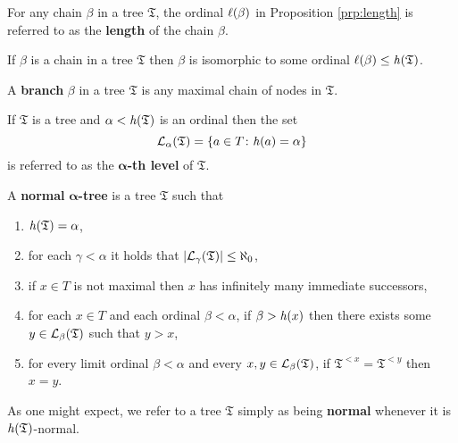 \begin{dfn}[Length]
	For any chain $\beta$ in a tree $\mathfrak{T}$, the ordinal $\ell(\beta)$ in Proposition \ref{prp:length} is referred to as the \textbf{length} of the chain $\beta$.
\end{dfn}

\begin{prp}\label{prp:length}
	If $\beta$ is a chain in a tree $\mathfrak{T}$ then $\beta$ is isomorphic to some ordinal $\ell(\beta)\leq\mathit{h}(\mathfrak{T})$.
\end{prp}

\begin{dfn}[Branch]
	A \textbf{branch} $\beta$ in a tree $\mathfrak{T}$ is any maximal chain of nodes in $\mathfrak{T}$.
\end{dfn}

\begin{dfn}[Levels]
	If $\mathfrak{T}$ is a tree and $\alpha<\mathit{h}(\mathfrak{T})$ is an ordinal then the set
	\begin{equation}
		\mathcal{L}_{\alpha}(\mathfrak{T})=\lbrace a\in T\colon \mathit{h}(a)=\alpha \rbrace
	\end{equation}
	is referred to as the $\bm{\alpha}$\textbf{-th level} of $\mathfrak{T}$.
\end{dfn}

\begin{dfn}[Normality]
	A \textbf{normal }$\bm{\alpha}$\textbf{-tree} is a tree $\mathfrak{T}$ such that
	\begin{enumerate}
		\item	$\mathit{h}(\mathfrak{T})=\alpha$,\label{dfn:n1}
		\item	for each $\gamma<\alpha$ it holds that $\left\lvert\mathcal{L}_{\gamma}(\mathfrak{T})\right\rvert\leq\aleph_0$,\label{dfn:n2}
		\item	if $x\in T$ is not maximal then $x$ has infinitely many immediate successors,\label{dfn:n3}
		\item	for each $x\in T$ and each ordinal $\beta<\alpha$, if $\beta>\mathit{h}(x)$ then there exists some $y\in\mathcal{L}_{\beta}(\mathfrak{T})$ such that $y>x$,\label{dfn:n4}
		\item	for every limit ordinal $\beta<\alpha$ and every $x,y\in\mathcal{L}_{\beta}(\mathfrak{T})$, if $\mathfrak{T}^{<x}=\mathfrak{T}^{<y}$ then $x=y$.\label{dfn:n5}
	\end{enumerate}
	As one might expect, we refer to a tree $\mathfrak{T}$ simply as being \textbf{normal} whenever it is $\mathit{h}(\mathfrak{T})$-normal.
\end{dfn}


